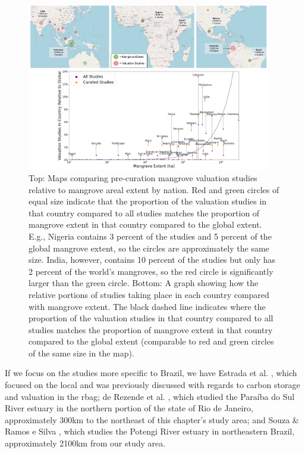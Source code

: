 \begin{figure}[!htb] 
\centering
\includegraphics[width=0.95\textwidth]{Figures/chap4/mangrove_area_studies_graphic_combo.png}
\caption[Mangrove Valuation Studies Compared to Mangrove Extent]{Top: Maps comparing pre-curation mangrove valuation studies relative to mangrove areal extent by nation. Red and green circles of equal size indicate that the proportion of the valuation studies in that country compared to all studies matches the proportion of mangrove extent in that country compared to the global extent. E.g., Nigeria contains 3 percent of the studies and 5 percent of the global mangrove extent, so the circles are approximately the same size. India, however, contains 10 percent of the studies but only has 2 percent of the world’s mangroves, so the red circle is significantly larger than the green circle.
Bottom: A graph showing how the relative portions of studies taking place in each country compared with mangrove extent. The black dashed line indicates where the proportion of the valuation studies in that country compared to all studies matches the proportion of mangrove extent in that country compared to the global extent (comparable to red and green circles of the same size in the map).}
\label{fig:mangrove_area_studies}
\end{figure}

If we focus on the studies more specific to Brazil, we have Estrada et al. \cite{estradaEconomicEvaluationCarbon2015}, which focused on the local and was previously discussed with regards to carbon storage and valuation in the \ac{rbag}; de Rezende et al. \cite{derezendeEconomicValuationMangrove2015}, which studied the Paraíba do Sul River estuary in the northern portion of the state of Rio de Janeiro, approximately 300km to the northeast of this chapter's study area; and Souza \& Ramos e Silva \cite{souzaEcologicalEconomicValuation2011}, which studies the Potengi River estuary in northeastern Brazil, approximately 2100km from our study area.

